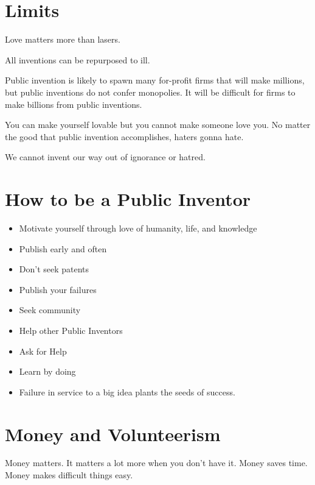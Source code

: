 \documentclass[
	fontsize=10pt, %
	twoside=false, %
	secnumdepth=1, %
]{kaobook}
\begin{document}
\chapter{Limits}

Love matters more than lasers.

All inventions can be repurposed to ill.

Public invention is likely to spawn many for-profit firms that will make millions,
but public inventions do not confer monopolies.
It will be difficult for firms to make billions from public inventions.

You can make yourself lovable but you cannot make someone love you.
No matter the good that public invention accomplishes, haters gonna hate.

We cannot invent our way out of ignorance or hatred.


\chapter{How to be a Public Inventor}


\begin{itemize}
\item Motivate yourself through love of humanity, life, and knowledge
\item Publish early and often
\item Don’t seek patents
\item Publish your failures
\item Seek community
\item Help other Public Inventors
\item Ask for Help
\item Learn by doing
\item Failure in service to a big idea plants the seeds of success.
\end{itemize}

\chapter{Money and Volunteerism}

Money matters. It matters a lot more when you don't have it.
Money saves time. Money makes difficult things easy.
\end{document}
